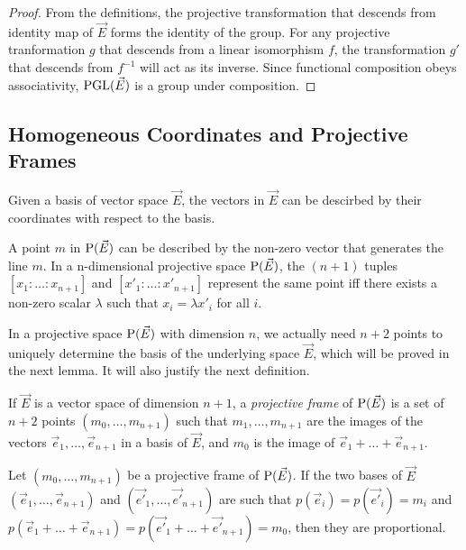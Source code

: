 \begin{proof}
  From the definitions, the projective transformation that descends from identity map of $\vec{E}$
  forms the identity of the group. For any projective tranformation $g$ that descends from a
  linear isomorphism $f$, the transformation $g'$ that descends from $f^{-1}$ will act as its
  inverse. Since functional composition obeys associativity, $\operatorname{PGL}(\vec{E})$ is a group under
  composition.
\end{proof}

\subsection{Homogeneous Coordinates and Projective Frames}

Given a basis of vector space $\vec{E}$, the vectors in $\vec{E}$ can be descirbed by their coordinates with
respect to the basis. 

\begin{definition}
  A point $m$ in $\operatorname{P}(\vec{E})$ can be described by the non-zero vector that generates the line $m$. In a
  n-dimensional projective space $\operatorname{P}(\vec{E})$, the $(n+1)$ tuples $[x_1:\dots:x_{n+1}]$ and
  $[x'_1:\dots:x'_{n+1}]$ represent the same point iff there exists a non-zero scalar $\lambda$
  such that $x_i=\lambda x'_i$ for all $i$.
\end{definition}

In a projective space $\operatorname{P}(\vec{E})$ with dimension $n$, we actually need $n+2$ points to uniquely determine
the basis of the underlying space $\vec{E}$, which will be proved in the next lemma. It will also
justify the next definition.

\begin{definition}
  If $\vec{E}$ is a vector space of dimension $n+1$, a \textit{projective frame} of $\operatorname{P}(\vec{E})$ is a set of
  $n+2$ points  $(m_0,\dots,m_{n+1})$ such that $m_1,\dots,m_{n+1}$ are the images of the
  vectors $\vec{e}_1,\dots,\vec{e}_{n+1}$ in a basis of $\vec{E}$, and $m_0$ is the image of
  $\vec{e}_1+\dots+\vec{e}_{n+1}$.
\end{definition}

\begin{lemma}
  Let $(m_0,\dots,m_{n+1})$ be a projective frame of $\operatorname{P}(\vec{E})$. If the two bases of $\vec{E}$
  $(\vec{e}_1,\dots,\vec{e}_{n+1})$ and $(\vec{e'}_1,\dots,\vec{e'}_{n+1})$ are such that $p(\vec{e}_i)=p(\vec{e'}_i)=m_i$ and
  $p(\vec{e}_1+\dots+\vec{e}_{n+1})=p(\vec{e'}_1+\dots+\vec{e'}_{n+1})=m_0$, then they are proportional.
\end{lemma}

